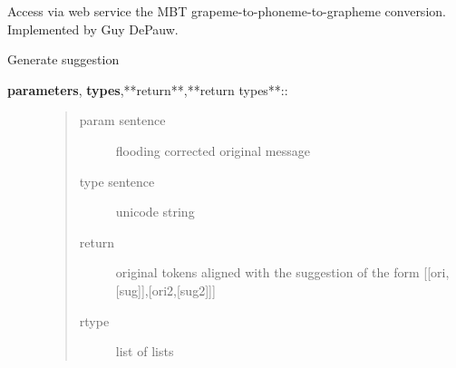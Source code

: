 \documentclass[letterpaper,10pt,english]{sphinxmanual}
\begin{document}
\begin{fulllineitems}
\label{API:norm.modules.phonemic.Phonemic}
Access via web service the MBT grapeme-to-phoneme-to-grapheme conversion.
Implemented by Guy DePauw.

\begin{fulllineitems}
\label{API:norm.modules.phonemic.Phonemic.generate_alternatives}
Generate suggestion
\begin{description}
\item[{\textbf{parameters}, \textbf{types},**return**,**return types**::}] \leavevmode\begin{quote}\begin{description}
\item[{param sentence}] \leavevmode
flooding corrected original message

\item[{type sentence}] \leavevmode
unicode string

\item[{return}] \leavevmode
original tokens aligned with the suggestion of the form {[}{[}ori,{[}sug{]}{]},{[}ori2,{[}sug2{]}{]}{]}

\item[{rtype}] \leavevmode
list of lists

\end{description}\end{quote}

\end{description}

\end{fulllineitems}


\end{fulllineitems}

\label{API:module-norm.modules.smt}
\end{document}
